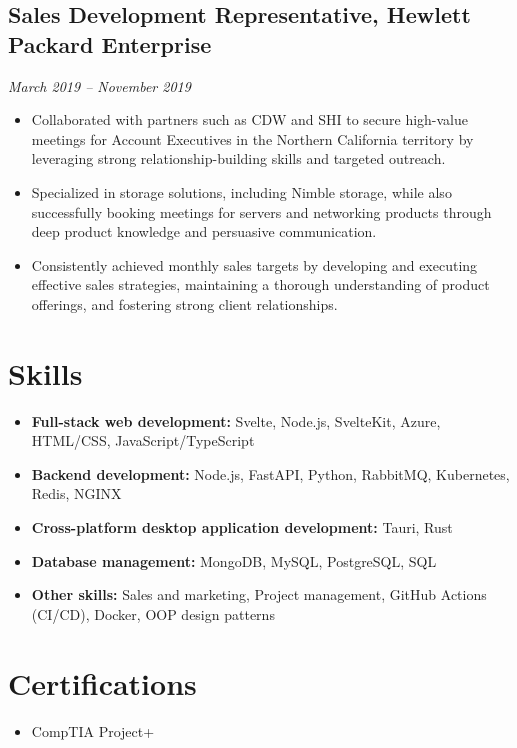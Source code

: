 \documentclass[a4paper,10pt]{article}
\begin{document}
\subsection*{Sales Development Representative, Hewlett Packard Enterprise}
\textit{March 2019 -- November 2019}
\begin{itemize}
    \item Collaborated with partners such as CDW and SHI to secure high-value meetings for Account Executives in the Northern California territory by leveraging strong relationship-building skills and targeted outreach.
    \item Specialized in storage solutions, including Nimble storage, while also successfully booking meetings for servers and networking products through deep product knowledge and persuasive communication.
    \item Consistently achieved monthly sales targets by developing and executing effective sales strategies, maintaining a thorough understanding of product offerings, and fostering strong client relationships.
\end{itemize}

\section*{Skills}
\begin{itemize}[leftmargin=0in, label={}]
    \item \textbf{Full-stack web development:} Svelte, Node.js, SvelteKit, Azure, HTML/CSS, JavaScript/TypeScript
    \item \textbf{Backend development:} Node.js, FastAPI, Python, RabbitMQ, Kubernetes, Redis, NGINX
    \item \textbf{Cross-platform desktop application development:} Tauri, Rust
    \item \textbf{Database management:} MongoDB, MySQL, PostgreSQL, SQL
    \item \textbf{Other skills:} Sales and marketing, Project management, GitHub Actions (CI/CD), Docker, OOP design patterns
\end{itemize}

\section*{Certifications}
\begin{itemize}[leftmargin=0in, label={}]
    \item CompTIA Project+
\end{itemize}
\end{document}
